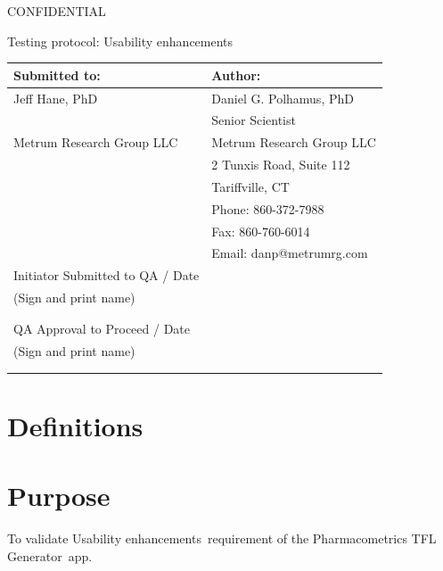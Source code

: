 \documentclass{article}
\newcommand{\tfl}{Pharmacometrics TFL Generator}
\newcommand{\topic}{Usability enhancements}
\begin{document}
\begin{center}
{\large CONFIDENTIAL} 


\vspace*{1cm}


\vspace*{1cm}

{\huge Testing protocol: \topic}
\vspace{3.0cm}

\begin{tabular}{|l|l|}\hline
Submitted to: & Author:\\\hline
Jeff Hane, PhD & Daniel G. Polhamus, PhD \\
&Senior Scientist\\
Metrum Research Group LLC & Metrum Research Group LLC\\
 & 2 Tunxis Road, Suite 112\\
  & Tariffville, CT\\
  & Phone: 860-372-7988 \\
 & Fax: 860-760-6014 \\
  & Email: danp@metrumrg.com \\\hline

  Initiator Submitted to QA  / Date & \\
  
 (Sign and print name) & \\
  & \\
  & \\\hline
  
QA Approval to Proceed / Date & \\

 (Sign and print name) & \\
  & \\
 & \\\hline

\end{tabular}

\end{center}

\newpage
\vspace{3in}
\section*{Definitions}


\section*{Purpose}
To validate \topic\ requirement of the \tfl\ app.
\end{document}
